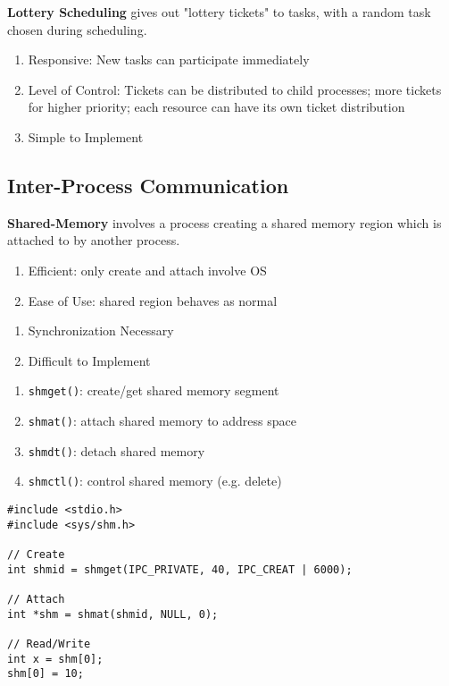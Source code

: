 \documentclass[12pt, a4paper]{article}
\begin{document}
\begin{multicols*}{3}
\textbf{Lottery Scheduling} gives out "lottery tickets" to tasks, with a random task chosen during scheduling.
\begin{enumerate}[$+$]
  \item Responsive: New tasks can participate immediately
  \item Level of Control: Tickets can be distributed to child processes; more tickets for higher priority; each resource can have its own ticket distribution
  \item Simple to Implement
\end{enumerate}
\vspace{-1em}
\colbreak
\subsection{Inter-Process Communication}

\textbf{Shared-Memory} involves a process creating a shared memory region which is attached to by another process.
\begin{enumerate}[$+$]
  \item Efficient: only create and attach involve OS
  \item Ease of Use: shared region behaves as normal
\end{enumerate}\vspace{-1pt}
\begin{enumerate}[$-$]
  \item Synchronization Necessary
  \item Difficult to Implement
\end{enumerate}\vspace{-1pt}
\begin{enumerate}[\roman*.]
  \item \lstinline|shmget()|: create/get shared memory segment
  \item \lstinline|shmat()|: attach shared memory to address space
  \item \lstinline|shmdt()|: detach shared memory
  \item \lstinline|shmctl()|: control shared memory (e.g. delete)
\end{enumerate}

\begin{lstlisting}
#include <stdio.h>
#include <sys/shm.h>

// Create
int shmid = shmget(IPC_PRIVATE, 40, IPC_CREAT | 6000);

// Attach
int *shm = shmat(shmid, NULL, 0);

// Read/Write 
int x = shm[0];
shm[0] = 10;


\end{lstlisting}
\end{multicols*}
\end{document}
